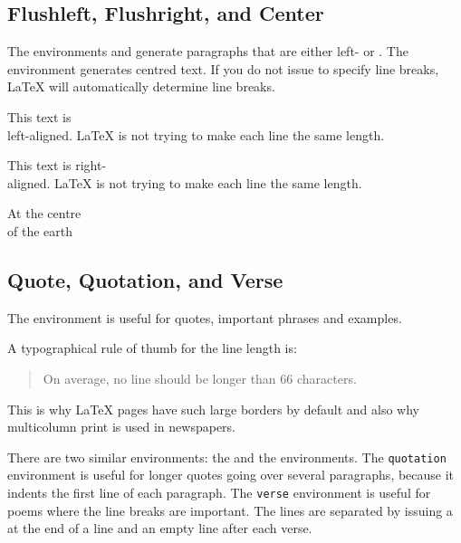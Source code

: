 \subsection{Flushleft, Flushright, and Center}

The environments  and  generate
paragraphs that are either left- or .  The  environment generates centred text. If you
do not issue \ci{\bs} to specify line breaks, \LaTeX{} will
automatically determine line breaks.

\begin{example}
\begin{flushleft}
This text is\\ left-aligned. 
\LaTeX{} is not trying to make 
each line the same length.
\end{flushleft}
\end{example}

\begin{example}
\begin{flushright}
This text is right-\\aligned. 
\LaTeX{} is not trying to make
each line the same length.
\end{flushright}
\end{example}

\begin{example}
\begin{center}
At the centre\\of the earth
\end{center}
\end{example}

\subsection{Quote, Quotation, and Verse}

The  environment is useful for quotes, important phrases and
examples.

\begin{example}
A typographical rule of thumb
for the line length is:
\begin{quote}
On average, no line should
be longer than 66 characters.
\end{quote}
This is why \LaTeX{} pages have 
such large borders by default
and also why multicolumn print
is used in newspapers.
\end{example}

There are two similar environments: the  and the
 environments. The \texttt{quotation} environment is useful
for longer quotes going over several paragraphs, because it indents the
first line of each paragraph. The \texttt{verse} environment is useful for poems
where the line breaks are important. The lines are separated by
issuing a \ci{\bs} at the end of a line and an empty line after each
verse.


